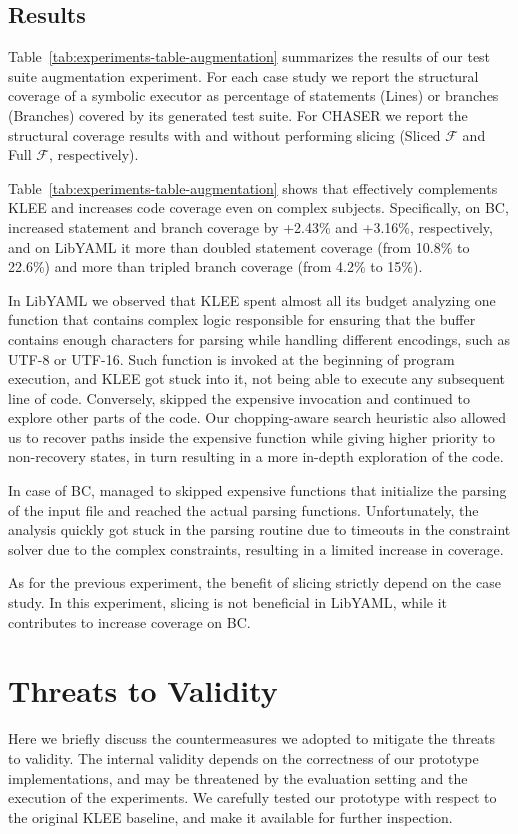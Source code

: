 \subsection{Results}
Table~\ref{tab:experiments-table-augmentation} summarizes the results
of our test suite augmentation experiment. For each case study we
report the structural coverage of a symbolic executor as percentage of
statements (Lines) or branches (Branches) covered by its generated
test suite. For CHASER we report the structural coverage results with
and without performing slicing (Sliced $\mathcal{F}$ and Full
$\mathcal{F}$, respectively).

Table~\ref{tab:experiments-table-augmentation} shows that \toolname
effectively complements KLEE and increases code coverage even on
complex subjects. Specifically, on \textsf{BC}, \toolname increased
statement and branch coverage by +2.43\% and +3.16\%, respectively,
and on \textsf{LibYAML} it more than doubled statement coverage (from
10.8\% to 22.6\%) and more than tripled branch coverage (from 4.2\% to
15\%).

In \textsf{LibYAML} we observed that KLEE spent almost all its budget
analyzing one function that contains complex logic responsible for
ensuring that the buffer contains enough characters for parsing while
handling different encodings, such as UTF-8 or UTF-16. Such function
is invoked at the beginning of program execution, and KLEE got stuck
into it, not being able to execute any subsequent line of
code. Conversely, \toolname skipped the expensive invocation and
continued to explore other parts of the code. Our chopping-aware
search heuristic also allowed us to recover paths inside the expensive
function while giving higher priority to non-recovery states, in turn
resulting in a more in-depth exploration of the code.

In case of \textsf{BC}, \toolname managed to skipped expensive
functions that initialize the parsing of the input file and reached
the actual parsing functions. Unfortunately, the analysis quickly got
stuck in the parsing routine due to timeouts in the constraint solver
due to the complex constraints, resulting in a limited increase in
coverage.

As for the previous experiment, the benefit of slicing strictly depend
on the case study. In this experiment, slicing is not beneficial in
\textsf{LibYAML}, while it contributes to increase coverage on
\textsf{BC}.

\section{Threats to Validity}
Here we briefly discuss the countermeasures we adopted to mitigate the
threats to validity. The internal validity depends on the correctness
of our prototype implementations, and may be threatened by the
evaluation setting and the execution of the experiments.  We carefully
tested our prototype with respect to the original KLEE baseline, and
make it available for further inspection.

